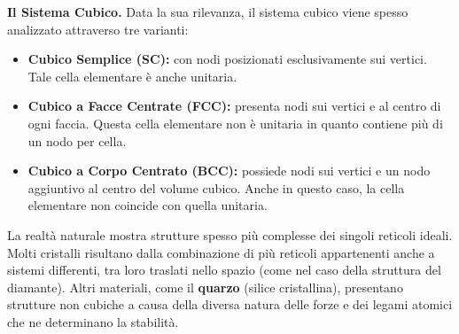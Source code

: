 \textbf{Il Sistema Cubico.} Data la sua rilevanza, il sistema cubico viene spesso analizzato attraverso tre varianti:
\begin{itemize}
    \item \textbf{Cubico Semplice (SC):} con nodi posizionati esclusivamente sui vertici. Tale cella elementare è anche unitaria.
    \item \textbf{Cubico a Facce Centrate (FCC):} presenta nodi sui vertici e al centro di ogni faccia. Questa cella elementare non è unitaria in quanto contiene più di un nodo per cella.
    \item \textbf{Cubico a Corpo Centrato (BCC):} possiede nodi sui vertici e un nodo aggiuntivo al centro del volume cubico. Anche in questo caso, la cella elementare non coincide con quella unitaria.
\end{itemize}

La realtà naturale mostra strutture spesso più complesse dei singoli reticoli ideali. Molti cristalli risultano dalla combinazione di più reticoli appartenenti anche a sistemi differenti, tra loro traslati nello spazio (come nel caso della struttura del diamante). Altri materiali, come il \textbf{quarzo} (silice cristallina), presentano strutture non cubiche a causa della diversa natura delle forze e dei legami atomici che ne determinano la stabilità.

